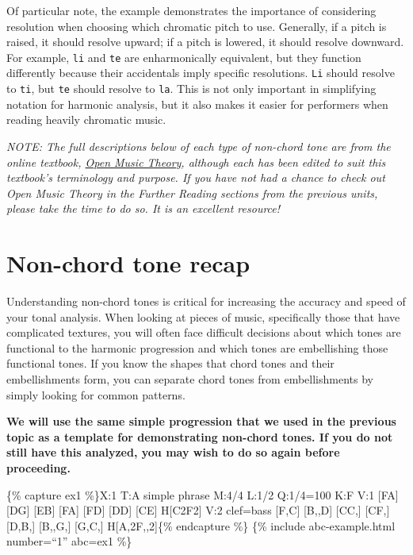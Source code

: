 \documentclass{book}
\begin{document}
Of particular note, the example demonstrates the importance of considering
resolution when choosing which chromatic pitch to use. Generally, if a pitch
is raised, it should resolve upward; if a pitch is lowered, it should resolve
downward. For example, \texttt{li} and \texttt{te} are enharmonically
equivalent, but they function differently because their accidentals imply
specific resolutions. \texttt{Li} should resolve to \texttt{ti}, but
\texttt{te} should resolve to \texttt{la}. This is not only important in
simplifying notation for harmonic analysis, but it also makes it easier for
performers when reading heavily chromatic music.

\emph{NOTE: The full descriptions below of each type of non-chord tone are
from the online textbook, \href{http://www.openmusictheory.com}{Open Music
Theory}, although each has been edited to suit this textbook's terminology and
purpose. If you have not had a chance to check out Open Music Theory in the
Further Reading sections from the previous units, please take the time to do
so. It is an excellent resource!}

\hypertarget{non-chord-tone-recap}{%
\section{Non-chord tone recap}\label{non-chord-tone-recap}}

Understanding non-chord tones is critical for increasing the accuracy and
speed of your tonal analysis. When looking at pieces of music, specifically
those that have complicated textures, you will often face difficult decisions
about which tones are functional to the harmonic progression and which tones
are embellishing those functional tones. If you know the shapes that chord
tones and their embellishments form, you can separate chord tones from
embellishments by simply looking for common patterns.

\textbf{We will use the same simple progression that we used in the previous
topic as a template for demonstrating non-chord tones. If you do not still
have this analyzed, you may wish to do so again before proceeding.}

\{\% capture ex1 \%\}X:1 T:A simple phrase M:4/4 L:1/2 Q:1/4=100 K:F V:1
{[}FA{]}\textbar{} {[}DG{]} {[}EB{]}\textbar{} {[}FA{]} {[}FD{]}\textbar{}
{[}DD{]} {[}CE{]}\textbar{} H{[}C2F2{]}\textbar{]} V:2 clef=bass
{[}F,C{]}\textbar{} {[}B,,D{]} {[}CC,{]}\textbar{} {[}CF,{]}
{[}D,B,{]}\textbar{} {[}B,,G,{]} {[}G,C,{]}\textbar{}
H{[}A,2F,,2{]}\textbar{]}\{\% endcapture \%\} \{\% include abc-example.html
number=``1'' abc=ex1 \%\}
\end{document}
